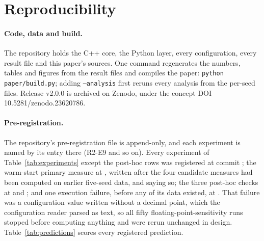 
\section{Reproducibility}
\label{app:repro}

\paragraph{Code, data and build.} The repository holds the C++ core, the Python
layer, every configuration, every result file and this paper's sources. One
command regenerates the numbers, tables and figures from the result files and
compiles the paper: \texttt{python paper/build.py}; adding \texttt{--analysis}
first reruns every analysis from the per-seed files. Release v2.0.0 is archived on
Zenodo, under the concept DOI 10.5281/zenodo.23620786.

\paragraph{Pre-registration.} The repository's pre-registration file is append-only,
and each experiment is named by its entry there (R2-E9 and so on). Every
experiment of Table~\ref{tab:experiments} except the post-hoc rows was registered
at commit \texttt{\regCommit}; the warm-start primary measure at
\texttt{\regCommitWarm}, written after the four candidate measures had been
computed on earlier five-seed data, and saying so; the three post-hoc checks at
\texttt{\regCommitCheckB} and \texttt{\regCommitCheckC}; and one execution failure,
before any of its data existed, at \texttt{\regCommitRepair}. That failure was a
configuration value written without a decimal point, which the configuration
reader parsed as text, so all fifty floating-point-sensitivity runs stopped before
computing anything and were rerun unchanged in design.
Table~\ref{tab:predictions} scores every registered prediction.

\begin{table}[p]
\centering

\caption{Every registered prediction and whether it held, scored by
\texttt{scripts/analyze\_extras.py} against the threshold its registration
states. Source: \texttt{data/processed/horizon/predictions.csv}.}
\label{tab:predictions}
\end{table}

